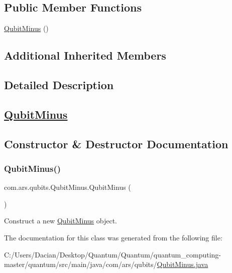 \subsection*{Public Member Functions}
\begin{DoxyCompactItemize}
\item 
\hyperlink{classcom_1_1ars_1_1qubits_1_1_qubit_minus_a6c5a09c7016467c22e2f7bdb741051b4}{Qubit\+Minus} ()
\end{DoxyCompactItemize}
\subsection*{Additional Inherited Members}


\subsection{Detailed Description}
\subsection*{\hyperlink{classcom_1_1ars_1_1qubits_1_1_qubit_minus}{Qubit\+Minus}}

\subsection{Constructor \& Destructor Documentation}
\hypertarget{classcom_1_1ars_1_1qubits_1_1_qubit_minus_a6c5a09c7016467c22e2f7bdb741051b4}{}\label{classcom_1_1ars_1_1qubits_1_1_qubit_minus_a6c5a09c7016467c22e2f7bdb741051b4} 
\subsubsection{\texorpdfstring{Qubit\+Minus()}{QubitMinus()}}
{\footnotesize\ttfamily com.\+ars.\+qubits.\+Qubit\+Minus.\+Qubit\+Minus (\begin{DoxyParamCaption}{ }\end{DoxyParamCaption})}

Construct a new {\ttfamily  \hyperlink{classcom_1_1ars_1_1qubits_1_1_qubit_minus}{Qubit\+Minus}} object. 

The documentation for this class was generated from the following file\+:\begin{DoxyCompactItemize}
\item 
C\+:/\+Users/\+Dacian/\+Desktop/\+Quantum/\+Quantum/quantum\+\_\+computing-\/master/quantum/src/main/java/com/ars/qubits/\hyperlink{_qubit_minus_8java}{Qubit\+Minus.\+java}\end{DoxyCompactItemize}
